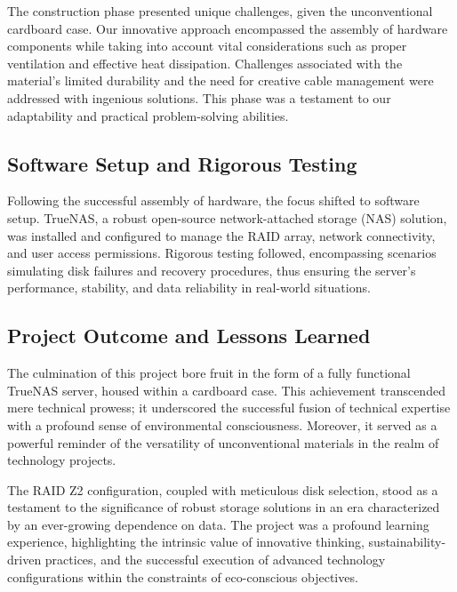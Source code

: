 The construction phase presented unique challenges, given the unconventional cardboard case. Our innovative approach encompassed the assembly of hardware components while taking into account vital considerations such as proper ventilation and effective heat dissipation. Challenges associated with the material's limited durability and the need for creative cable management were addressed with ingenious solutions. This phase was a testament to our adaptability and practical problem-solving abilities.

\subsection{Software Setup and Rigorous Testing}

Following the successful assembly of hardware, the focus shifted to software setup. TrueNAS, a robust open-source network-attached storage (NAS) solution, was installed and configured to manage the RAID array, network connectivity, and user access permissions. Rigorous testing followed, encompassing scenarios simulating disk failures and recovery procedures, thus ensuring the server's performance, stability, and data reliability in real-world situations.

\subsection{Project Outcome and Lessons Learned}

The culmination of this project bore fruit in the form of a fully functional TrueNAS server, housed within a cardboard case. This achievement transcended mere technical prowess; it underscored the successful fusion of technical expertise with a profound sense of environmental consciousness. Moreover, it served as a powerful reminder of the versatility of unconventional materials in the realm of technology projects.

The RAID Z2 configuration, coupled with meticulous disk selection, stood as a testament to the significance of robust storage solutions in an era characterized by an ever-growing dependence on data. The project was a profound learning experience, highlighting the intrinsic value of innovative thinking, sustainability-driven practices, and the successful execution of advanced technology configurations within the constraints of eco-conscious objectives.
